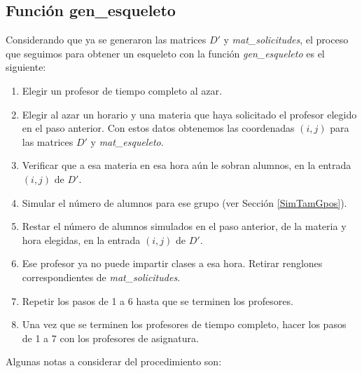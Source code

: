 \subsection{Función gen\_esqueleto} \label{subsec_gen_esqueleto}

Considerando que ya se generaron las matrices $D'$ y \textit{mat\_solicitudes}, el proceso que seguimos para obtener un esqueleto con la función \textit{gen\_esqueleto} es el siguiente:
  
  \begin{enumerate}
%

\item Elegir un profesor de tiempo completo al azar.

\item Elegir al azar un horario y una materia que haya solicitado el profesor elegido en el paso anterior. Con estos datos obtenemos las coordenadas $(i,j)$ para las matrices $D'$ y \textit{mat\_esqueleto}.

\item Verificar que a esa materia en esa hora aún le sobran alumnos, en la entrada $(i,j)$ de $D'$.

\item Simular el número de alumnos para ese grupo (ver Sección \ref{SimTamGpos}).

\item Restar el número de alumnos simulados en el paso anterior, de la materia y hora elegidas, en la entrada $(i,j)$ de $D'$.

\item Ese profesor ya no puede impartir clases a esa hora. Retirar renglones correspondientes de \textit{mat\_solicitudes}.

\item Repetir los pasos de 1 a 6 hasta que se terminen los profesores.

\item Una vez que se terminen los profesores de tiempo completo, hacer los pasos de 1 a 7 con los profesores de asignatura.
\end{enumerate}

Algunas notas a considerar del procedimiento son:
  
